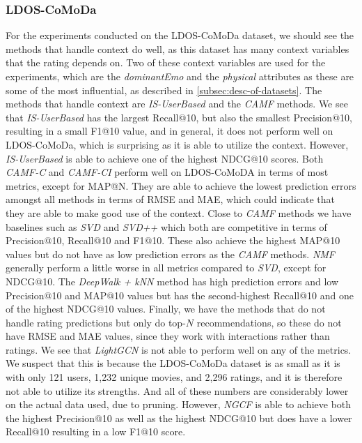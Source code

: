 \subsubsection{LDOS-CoMoDa}
For the experiments conducted on the LDOS-CoMoDa dataset, we should see the methods that handle context do well, as this dataset has many context variables that the rating depends on.
Two of these context variables are used for the experiments, which are the \textit{dominantEmo} and the \textit{physical} attributes as these are some of the most influential, as described in \autoref{subsec:desc-of-datasets}.
The methods that handle context are \textit{IS-UserBased} and the \textit{CAMF} methods.
We see that \textit{IS-UserBased} has the largest Recall@10, but also the smallest Precision@10, resulting in a small F1@10 value, and in general, it does not perform well on LDOS-CoMoDa, which is surprising as it is able to utilize the context.
However, \textit{IS-UserBased} is able to achieve one of the highest NDCG@10 scores.
Both \textit{CAMF-C} and \textit{CAMF-CI} perform well on LDOS-CoMoDA in terms of most metrics, except for MAP@N.
They are able to achieve the lowest prediction errors amongst all methods in terms of RMSE and MAE, which could indicate that they are able to make good use of the context.
Close to \textit{CAMF} methods we have baselines such as \textit{SVD} and \textit{SVD++} which both are competitive in terms of Precision@10, Recall@10 and F1@10. 
These also achieve the highest MAP@10 values but do not have as low prediction errors as the \textit{CAMF} methods.
\textit{NMF} generally perform a little worse in all metrics compared to \textit{SVD}, except for NDCG@10.
The \textit{DeepWalk + kNN} method has high prediction errors and low Precision@10 and MAP@10 values but has the second-highest Recall@10 and one of the highest NDCG@10 values.
Finally, we have the methods that do not handle rating predictions but only do top-$N$ recommendations, so these do not have RMSE and MAE values, since they work with interactions rather than ratings.
We see that \textit{LightGCN} is not able to perform well on any of the metrics.
We suspect that this is because the LDOS-CoMoDa dataset is as small as it is with only 121 users, 1,232 unique movies, and 2,296 ratings, and it is therefore not able to utilize its strengths.
And all of these numbers are considerably lower on the actual data used, due to pruning.
However, \textit{NGCF} is able to achieve both the highest Precision@10 as well as the highest NDCG@10 but does have a lower Recall@10 resulting in a low F1@10 score.
